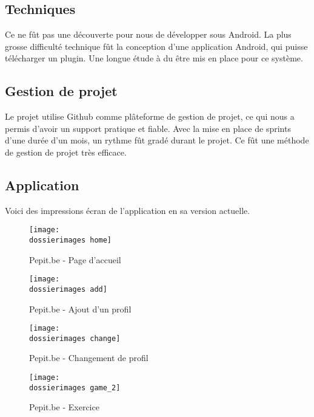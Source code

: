 \subsection{Techniques}
Ce ne f\^{u}t pas une découverte pour nous de développer sous Android. La plus grosse difficulté technique fût la conception d'une application Android, qui puisse télécharger un plugin. Une longue étude à du être mis en place pour ce système.

\subsection{Gestion de projet}
Le projet utilise Github comme plâteforme de gestion de projet, ce qui nous a permis d'avoir un support pratique et fiable. Avec la mise en place de sprints d'une durée d'un mois, un rythme f\^{u}t gradé durant le projet. Ce f\^{u}t une méthode de gestion de projet très efficace.

\subsection{Application}
Voici des impressions écran de l'application en sa version actuelle.
\begin{figure}[H]
   	\begin{minipage}[c]{.46\linewidth}
		\texttt{[image: \\dossierimages home]} 
		\caption{Pepit.be - Page d'accueil}
		\label{Pepit.be - Page d'accueil}
   	\end{minipage} \hfill
  	\begin{minipage}[c]{.46\linewidth}
      	\texttt{[image: \\dossierimages add]}
     	\caption{Pepit.be - Ajout d'un profil}
		\label{Pepit.be - Ajout d'un profil}
   	\end{minipage}
\end{figure}
\begin{figure}[H]
   	\begin{minipage}[c]{.46\linewidth}
		\texttt{[image: \\dossierimages change]} 
		\caption{Pepit.be - Changement de profil}
		\label{Pepit.be - Changement de profil}
   	\end{minipage} \hfill
  	\begin{minipage}[c]{.46\linewidth}
      	\texttt{[image: \\dossierimages game\_2]}
     	\caption{Pepit.be - Exercice}
		\label{Pepit.be - Exercice}
   	\end{minipage}
\end{figure}